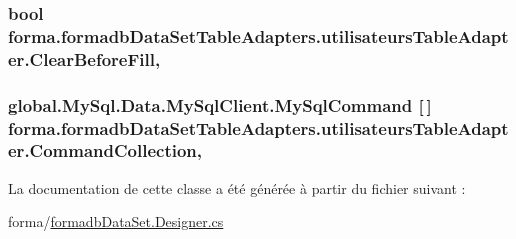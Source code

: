 \subsubsection[{\texorpdfstring{Clear\+Before\+Fill}{ClearBeforeFill}}]{\setlength{\rightskip}{0pt plus 5cm}bool forma.\+formadb\+Data\+Set\+Table\+Adapters.\+utilisateurs\+Table\+Adapter.\+Clear\+Before\+Fill\hspace{0.3cm}{\ttfamily [get]}, {\ttfamily [set]}}\hypertarget{classforma_1_1formadb_data_set_table_adapters_1_1utilisateurs_table_adapter_a7520a85f61c9728142f785f93717ca35}{}\label{classforma_1_1formadb_data_set_table_adapters_1_1utilisateurs_table_adapter_a7520a85f61c9728142f785f93717ca35}
\subsubsection[{\texorpdfstring{Command\+Collection}{CommandCollection}}]{\setlength{\rightskip}{0pt plus 5cm}global.\+My\+Sql.\+Data.\+My\+Sql\+Client.\+My\+Sql\+Command \mbox{[}$\,$\mbox{]} forma.\+formadb\+Data\+Set\+Table\+Adapters.\+utilisateurs\+Table\+Adapter.\+Command\+Collection\hspace{0.3cm}{\ttfamily [get]}, {\ttfamily [protected]}}\hypertarget{classforma_1_1formadb_data_set_table_adapters_1_1utilisateurs_table_adapter_aad54a4b359208280429b7262d64362e5}{}\label{classforma_1_1formadb_data_set_table_adapters_1_1utilisateurs_table_adapter_aad54a4b359208280429b7262d64362e5}


La documentation de cette classe a été générée à partir du fichier suivant \+:\begin{DoxyCompactItemize}
\item 
forma/\hyperlink{formadb_data_set_8_designer_8cs}{formadb\+Data\+Set.\+Designer.\+cs}\end{DoxyCompactItemize}
